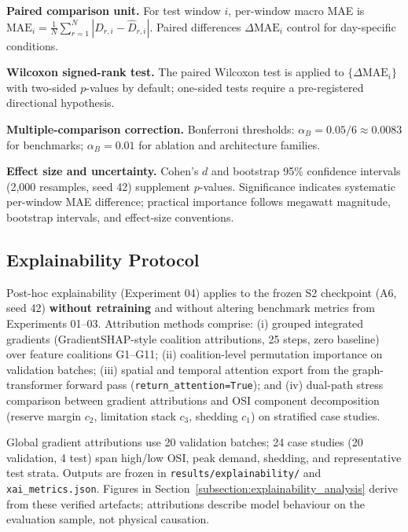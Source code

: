 \textbf{Paired comparison unit.} For test window \(i\), per-window macro MAE is \(\mathrm{MAE}_i = \frac{1}{N} \sum_{r=1}^{N} |D_{r,i} - \hat{D}_{r,i}|\). Paired differences \(\Delta\mathrm{MAE}_i\) control for day-specific conditions.

\textbf{Wilcoxon signed-rank test.} The paired Wilcoxon test \cite{Wilcoxon1945SignedRank} is applied to \(\{\Delta\mathrm{MAE}_i\}\) with two-sided \(p\)-values by default; one-sided tests require a pre-registered directional hypothesis.

\textbf{Multiple-comparison correction.} Bonferroni thresholds: \(\alpha_B = 0.05/6 \approx 0.0083\) for benchmarks; \(\alpha_B = 0.01\) for ablation and architecture families.

\textbf{Effect size and uncertainty.} Cohen's \(d\) \cite{Cohen1988StatisticalPower} and bootstrap 95\% confidence intervals \cite{Efron1993Bootstrap} (2{,}000 resamples, seed 42) supplement \(p\)-values. Significance indicates systematic per-window MAE difference; practical importance follows megawatt magnitude, bootstrap intervals, and effect-size conventions.

\subsection{Explainability Protocol}\label{subsection:explainability_protocol}

Post-hoc explainability (Experiment 04) applies to the frozen S2 checkpoint (A6, seed 42) \textbf{without retraining} and without altering benchmark metrics from Experiments 01--03. Attribution methods comprise: (i) grouped integrated gradients (GradientSHAP-style coalition attributions, 25 steps, zero baseline) over feature coalitions G1--G11; (ii) coalition-level permutation importance on validation batches; (iii) spatial and temporal attention export from the graph-transformer forward pass (\texttt{return\_attention=True}); and (iv) dual-path stress comparison between gradient attributions and OSI component decomposition (reserve margin \(c_2\), limitation stack \(c_3\), shedding \(c_1\)) on stratified case studies.

Global gradient attributions use 20 validation batches; 24 case studies (20 validation, 4 test) span high/low OSI, peak demand, shedding, and representative test strata. Outputs are frozen in \texttt{results/explainability/} and \texttt{xai\_metrics.json}. Figures in Section~\ref{subsection:explainability_analysis} derive from these verified artefacts; attributions describe model behaviour on the evaluation sample, not physical causation.



